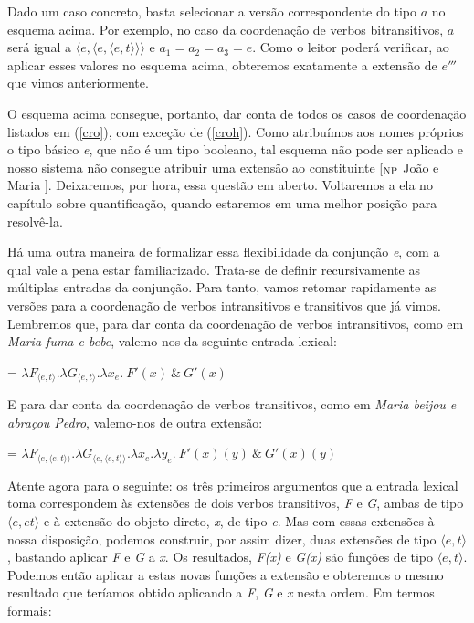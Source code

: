 \n Dado um caso concreto, basta selecionar a versão correspondente do tipo $a$ no esquema acima. Por exemplo, no caso da coordenação de verbos bitransitivos, $a$ será igual a $\langle e, \langle e, \langle e,t\rangle\rangle\rangle$ e $a_{1}=a_{2}=a_{3}=e$. Como o leitor poderá verificar, ao aplicar esses valores no esquema acima, obteremos exatamente a extensão de $e'''$ que vimos anteriormente.
    
O esquema acima consegue, portanto, dar conta de
todos os casos de coordena\-ção listados em (\ref{cro}), com
exce\-ção de (\ref{croh}). Como atribuímos aos nomes próprios o
tipo básico \textit{e}, que não é um tipo booleano, tal esquema não pode ser aplicado e nosso sistema não
consegue atribuir uma extensão ao constituinte [$_{\text{\textsc{NP}}}$ João e Maria ]. Deixaremos, por hora, essa
questão em aberto. Voltaremos a ela no capítulo sobre
quantifica\-ção, quando estaremos em uma melhor posi\-ção para
resolvê-la.

Há uma outra maneira de formalizar essa flexibilidade da conjunção \textit{e}, com a qual vale a pena estar familiarizado. Trata-se de definir recursivamente as múltiplas entradas da conjunção. Para tanto, vamos retomar rapidamente as versões para a coordenação de verbos intransitivos e transitivos que já vimos. Lembremos que, para dar conta da coordenação de verbos intransitivos, como em \textit{Maria fuma e bebe}, valemo-nos da seguinte entrada lexical:

\begin{exe}
	\ex {} = $\lambda F_{\langle e,t\rangle}.\lambda G_{\langle e,t\rangle}.\lambda x_{e}.\ F'(x)\ \&\ G'(x)$
\end{exe}

\n E para dar conta da coordenação de verbos transitivos, como em \textit{Maria beijou e abraçou Pedro}, valemo-nos de outra extensão:

\begin{exe}
	\ex {} = $\lambda F_{\langle e,\langle e,t\rangle\rangle}.\lambda G_{\langle e,\langle e,t\rangle\rangle}.\lambda x_{e}.\lambda y_{e}.\ F'(x)(y)\ \&\ G'(x)(y)$
\end{exe}

\n Atente agora para o seguinte: os três primeiros argumentos que
a entrada lexical  toma correspondem às extensões de dois
verbos transitivos, \textit{F} e \textit{G}, ambas de tipo
$\langle e, et\rangle$ e à extensão do objeto direto, \textit{x},
de tipo \textit{e}. Mas com essas extensões à nossa disposição,
podemos construir, por assim dizer, duas extensões de tipo
$\langle e,t\rangle$, bastando aplicar \textit{F} e \textit{G} a
\textit{x}. Os resultados, \textit{F(x)} e \textit{G(x)} são
funções de tipo $\langle e,t\rangle$. Podemos então aplicar a
estas novas funções a extensão  e obteremos o mesmo
resultado que teríamos obtido aplicando  a
\textit{F}, \textit{G} e \textit{x} nesta ordem. Em termos
formais:

